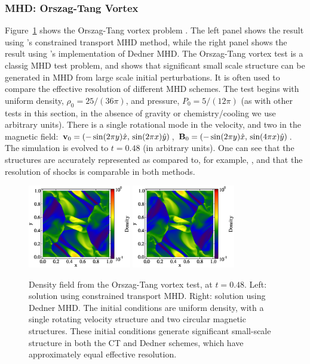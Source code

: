 \subsubsection{MHD: Orszag-Tang Vortex}
\label{sec.tests.mhd}
Figure~\ref{fig.orszag} shows the Orszag-Tang vortex problem \citep{Orszag79}.  The left panel shows
the result using \enzo's constrained transport MHD method, while the right panel shows the result using
\enzo's implementation of Dedner MHD.
The Orszag-Tang vortex test is a classig MHD test problem, and shows that significant small scale structure can be generated in MHD
from large scale initial perturbations.  It is often used to compare the
effective resolution of different MHD schemes.  The test begins with uniform
density, $\rho_0=25/(36\pi)$, and pressure, $P_0=5/(12\pi)$ (as with
other tests in this section, in the absence of gravity or chemistry/cooling we use
arbitrary units).  There is a
single rotational mode in the velocity, and two in the magnetic field:
${\bf v}_0 = (-\sin(2\pi y) \hat{x},\, \sin(2\pi x) \hat{y})$,
${\bf B}_0 = (-\sin(2\pi y) \hat{x},\, \sin(4\pi x) \hat{y})$.
The simulation is evolved to $t=0.48$ (in arbitrary units).  One can see that the structures
are accurately represented as compared to, for example,
\citet{Toth00}, and that the resolution of shocks is comparable in
both methods.

\begin{figure}
\begin{center}
\includegraphics[width=0.4\textwidth]{figures/MHDCT_OrszagTang_Density.eps}
\includegraphics[width=0.4\textwidth]{figures/MHDDedner_OrszagTang_Density.eps}
\caption{Density field from the Orszag-Tang vortex test, at $t=0.48$.
Left: solution using constrained transport MHD.  Right: solution using
Dedner MHD. The initial conditions are uniform density, with a single
rotating velocity structure and two circular magnetic structures.
These initial conditions generate significant small-scale structure in
both the CT and Dedner schemes, which have approximately equal
effective resolution.}
\label{fig.orszag}
\end{center}
\end{figure}
